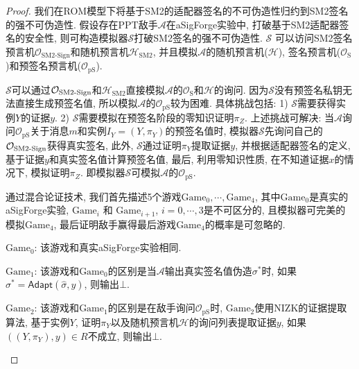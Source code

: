 \documentclass[review]{jcr}
\begin{document}
\begin{proof}
我们在ROM模型下将基于SM2的适配器签名的不可伪造性归约到SM2签名的强不可伪造性. 假设存在PPT敌手$\mathcal{A}$在aSigForge实验中, 打破基于SM2适配器签名的安全性, 则可构造模拟器$\mathcal{S}$打破SM2签名的强不可伪造性. 
$\mathcal{S}$ 可以访问SM2签名预言机$\mathcal{O}_{\text{SM2-Sign}}$和随机预言机$\mathcal{H}_{\text{SM2}}$, 并且模拟$\mathcal{A}$的随机预言机($\mathcal{H}$), 签名预言机($\mathcal{O}_{\text{S}}$)和预签名预言机($\mathcal{O}_{\text{pS}}$). 

$\mathcal{S}$可以通过$\mathcal{O}_{\text{SM2\text{-}Sign}}$和$\mathcal{H}_{\text{SM2}}$直接模拟$\mathcal{A}$的$\mathcal{O}_{\text{S}}$和$\mathcal{H}$的询问. 因为$\mathcal{S}$没有预签名私钥无法直接生成预签名值, 所以模拟$\mathcal{A}$的$\mathcal{O}_{\text{pS}}$较为困难. 具体挑战包括: 1) $\mathcal{S}$需要获得实例$Y$的证据$y$. 2) $\mathcal{S}$需要模拟在预签名阶段的零知识证明$\pi_Z$. 上述挑战可解决: 当$\mathcal{A}$询问$\mathcal{O}_{\text{pS}}$关于消息$m$和实例$I_Y = (Y, \pi_Y)$的预签名值时, 模拟器$\mathcal{S}$先询问自己的$\mathcal{O}_{\text{SM2\text{-}Sign}}$获得真实签名, 此外, $\mathcal{S}$通过证明$\pi_Y$提取证据$y$, 并根据适配器签名的定义, 基于证据$y$和真实签名值计算预签名值, 最后, 利用零知识性质, 在不知道证据$x$的情况下, 模拟证明$\pi_Z$. 即模拟器$\mathcal{S}$可模拟$\mathcal{A}$的$\mathcal{O}_{\text{pS}}$. 

通过混合论证技术, 我们首先描述5个游戏$\text{Game}_0,\cdots,\text{Game}_4$, 其中$\text{Game}_0$是真实的aSigForge实验, $\text{Game}_i$ 和 $\text{Game}_{i+1}$, $i = 0,\cdots,3$是不可区分的, 且模拟器可完美的模拟$\text{Game}_4$, 最后证明敌手赢得最后游戏$\text{Game}_4$的概率是可忽略的. 

\begin{trivlist}
\item $\text{Game}_0$: 该游戏和真实aSigForge实验相同. 
\end{trivlist}

\begin{trivlist}
\item $\text{Game}_1$: 该游戏和$\text{Game}_0$的区别是当$\mathcal{A}$输出真实签名值伪造$\sigma^*$时, 如果$\sigma^*=\mathsf{Adapt}(\hat{\sigma},y)$, 则输出$\bot$. 
\end{trivlist}

\begin{trivlist}
\item $\text{Game}_2$: 该游戏和$\text{Game}_1$的区别是在敌手询问$\mathcal{O}_{\text{pS}}$时, $\text{Game}_2$使用NIZK的证据提取算法, 基于实例$Y$, 证明$\pi_Y$以及随机预言机$\mathcal{H}$的询问列表提取证据$y$, 如果$((Y, \pi_Y), y) \in R$不成立, 则输出$\bot$. 
\end{trivlist}


\end{proof}
\end{document}
